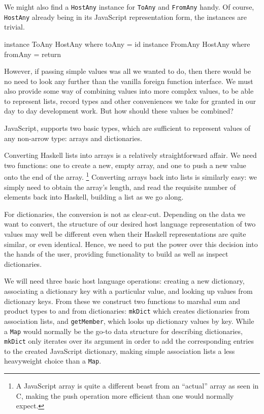 \documentclass{sigplanconf}
\begin{document}
We might also find a \lstinline!HostAny! instance for \lstinline!ToAny!
and \lstinline!FromAny! handy. Of course, \lstinline!HostAny! already being
in its JavaScript representation form, the instances are trivial.

\begin{code}
instance ToAny   HostAny where toAny   = id
instance FromAny HostAny where fromAny = return
\end{code}

However, if passing simple values was all we wanted to do, then there would be
no need to look any further than the vanilla foreign function interface.
We must also provide some way of combining values into more complex values,
to be able to represent lists, record types and other conveniences we take for
granted in our day to day development work.
But how should these values be combined?

JavaScript, supports two basic types, which are
sufficient to represent values of any non-arrow type: arrays and dictionaries.

Converting Haskell lists into arrays is a relatively straightforward affair.
We need two functions: one to create a new, empty array, and one to push a
new value onto the end of the array.%
\footnote{A JavaScript array is quite a different beast from an ``actual'' array
  as seen in C, making the push operation more efficient than one would normally
  expect.
}
Converting arrays back into lists is similarly easy: we simply need to obtain
the array's length, and read the requisite number of elements back into
Haskell, building a list as we go along.

For dictionaries, the conversion is not as clear-cut. Depending on the data
we want to convert, the structure of our desired host language representation
of two values may well be different even when their Haskell
representations are quite similar, or even identical.
Hence, we need to put the power over this decision into the hands of the user,
providing functionality to build as well as inspect dictionaries.

We will need three basic host language operations: creating a new dictionary,
associating a dictionary key with a particular value, and looking up values
from dictionary keys. From these we construct two functions to marshal sum and
product types to and from dictionaries: \lstinline!mkDict! which creates
dictionaries from association lists,
and \lstinline!getMember!, which looks up dictionary values by key.
While a \lstinline!Map! would normally be the go-to data structure for
describing dictionaries, \lstinline!mkDict! only iterates over its argument
in order to add the corresponding entries to the created JavaScript dictionary,
making simple association lists a less heavyweight choice than a
\lstinline!Map!.
\end{document}
